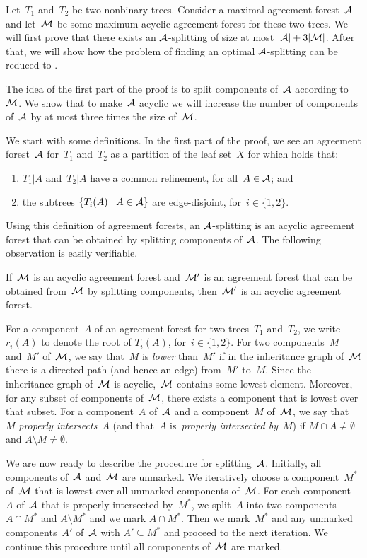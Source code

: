 Let~$T_1$ and~$T_2$ be two nonbinary trees. Consider a maximal agreement forest~${\mathcal A}$ and let~${\mathcal M}$ be some maximum acyclic agreement forest for these two trees. We will first prove that there exists an ${\mathcal A}$-splitting of size at most $|{\mathcal A}|+3|{\mathcal M}|$. After that, we will show how the problem of finding an optimal ${\mathcal A}$-splitting can be reduced to \dfvs.

The idea of the first part of the proof is to split components of~${\mathcal A}$ according to~${\mathcal M}$. We show that to make~${\mathcal A}$ acyclic we will increase the number of components of~${\mathcal A}$ by at most three times the size of~${\mathcal M}$.

We start with some definitions. In the first part of the proof, we see an agreement forest~${\mathcal A}$ for~$T_1$ and~$T_2$ as a partition of the leaf set~$X$ for which holds that:
\begin{enumerate}
\item $T_1|A$ and~$T_2|A$ have a common refinement, for all~$A\in{\mathcal A}$; and
\item the subtrees $\{T_i(A)\mid A\in{\mathcal A}\}$ are edge-disjoint, for~$i\in\{1,2\}$.
\end{enumerate}

Using this definition of agreement forests, an ${\mathcal A}$-splitting is an acyclic agreement forest that can be obtained by splitting components of~${\mathcal A}$. The following observation is easily verifiable.

\begin{observation}\label{obs:acylic}
If~${\mathcal M}$ is an acyclic agreement forest and~${\mathcal M}'$ is an agreement forest that can be obtained from~${\mathcal M}$ by splitting components, then~${\mathcal M}'$ is an acyclic agreement forest.
\end{observation}

For a component~$A$ of an agreement forest for two trees~$T_1$ and~$T_2$, we write $r_i(A)$ to denote the root of $T_i(A)$, for~$i\in\{1,2\}$. For two components~$M$ and~$M'$ of~${\mathcal M}$, we say that~$M$ is \emph{lower} than~$M'$ if in the inheritance graph of~${\mathcal M}$ there is a directed path (and hence an edge) from~$M'$ to~$M$. Since the inheritance graph of~${\mathcal M}$ is acyclic,~${\mathcal M}$ contains some lowest element. Moreover, for any subset of components of~${\mathcal M}$, there exists a component that is lowest over that subset. For a component~$A$ of~${\mathcal A}$ and a component~$M$ of~${\mathcal M}$, we say that~$M$ {\em properly intersects}~$A$ (and that~$A$ is~\emph{properly intersected by}~$M$) if $M\cap A \neq \emptyset$ and $A\setminus M\neq \emptyset$.

We are now ready to describe the procedure for splitting~${\mathcal A}$. Initially, all components of~${\mathcal A}$ and~${\mathcal M}$ are unmarked. We iteratively choose a component~$M^*$ of~${\mathcal M}$ that is lowest over all unmarked components of~${\mathcal M}$. For each component~$A$ of~${\mathcal A}$ that is properly intersected by~$M^*$, we split~$A$ into two components $A\cap M^*$ and $A\setminus M^*$ and we mark $A\cap M^*$. Then we mark~$M^*$ and any unmarked components~$A'$ of~${\mathcal A}$ with $A'\subseteq M^*$ and proceed to the next iteration. We continue this procedure until all components of~${\mathcal M}$ are marked.

